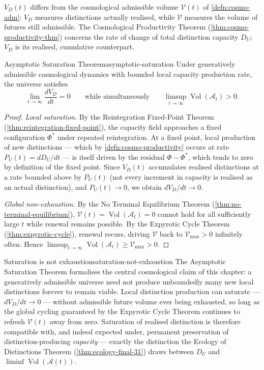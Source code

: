 \documentclass[12pt,twoside,openright]{book}
\newcommand{\adm}{\mathcal{A}}
\newcommand{\Vol}{\operatorname{Vol}}
\begin{document}
$V_D(t)$ differs from the cosmological admissible volume
$\mathcal{V}(t)$ of \cref{defn:cosmo-adm}: $V_D$
measures
distinctions actually realised, while $\mathcal{V}$ measures
the volume of futures still admissible. The Cosmological
Productivity Theorem (\cref{thm:cosmo-productivity-thm})
concerns the rate of change of total distinction capacity
$D_U$; $V_D$ is its realised, cumulative counterpart.

\begin{theorem}{Asymptotic Saturation Theorem}{asymptotic-saturation}
  Under generatively admissible cosmological dynamics with
  bounded local capacity production rate, the universe
  satisfies
  \[
    \lim_{t\to\infty} \frac{dV_D}{dt} = 0
    \qquad\text{while simultaneously}\qquad
    \limsup_{t\to\infty} \Vol(\mathcal{A}_t) > 0.
  \]
\end{theorem}

\begin{proof}
  \emph{Local saturation.} By the Reintegration Fixed-Point
  Theorem (\cref{thm:reintegration-fixed-point}), the
  capacity field approaches a fixed configuration $\Phi^*$
  under repeated reintegration. At a fixed point, local
  production of new distinctions --- which by
  \cref{defn:cosmo-productivity} occurs at rate
  $P_U(t) = dD_U/dt$ --- is itself driven by the residual
  $\Phi - \Phi^*$, which tends to zero by definition of the
  fixed point. Since $V_D(t)$ accumulates realised
  distinctions at a rate bounded above by $P_U(t)$ (not
  every increment in capacity is realised as an actual
  distinction), and $P_U(t)\to0$, we obtain
  $dV_D/dt \to 0$.

  \emph{Global non-exhaustion.} By the No Terminal
  Equilibrium Theorem (\cref{thm:no-terminal-equilibrium}),
  $\mathcal{V}(t) = \Vol(\mathcal{A}_t) = 0$ cannot hold for
  all sufficiently large $t$ while renewal remains possible.
  By the Expyrotic Cycle Theorem
  (\cref{thm:expyrotic-cycle}), renewal recurs, driving
  $\mathcal{V}$ back to $\mathcal{V}_{\max} > 0$ infinitely
  often. Hence
  $\limsup_{t\to\infty}\Vol(\mathcal{A}_t) \ge
  \mathcal{V}_{\max} > 0$.
\end{proof}

\begin{remark}{Saturation is not exhaustion}{saturation-not-exhaustion}
  The Asymptotic Saturation Theorem formalises the central
  cosmological claim of this chapter: a generatively
  admissible universe need not produce unboundedly many new
  local distinctions forever to remain viable. Local
  distinction production can saturate --- $dV_D/dt\to0$ ---
  without admissible future volume ever being exhausted, so
  long as the global cycling guaranteed by the Expyrotic
  Cycle Theorem continues to refresh $\mathcal{V}(t)$ away
  from zero. Saturation of realised distinction is therefore
  compatible with, and indeed expected under, permanent
  preservation of distinction-producing \emph{capacity} ---
  exactly the distinction the Ecology of Distinctions
  Theorem (\cref{thm:ecology-final-31}) draws between
  $D_U$ and $\liminf\Vol(\adm(t))$.
\end{remark}
\end{document}
